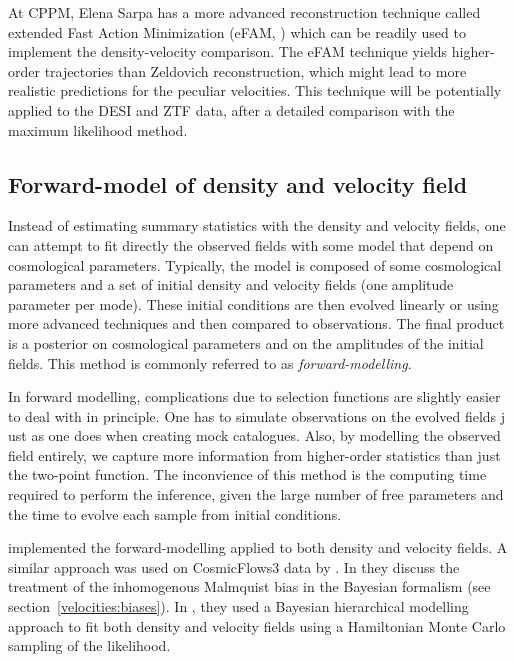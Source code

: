     At CPPM, Elena Sarpa has a more advanced reconstruction technique 
    called extended Fast Action Minimization (eFAM, \cite{sarpaExtendedFastAction2021})
    which can be readily used to implement the density-velocity comparison.
    The eFAM technique yields higher-order trajectories than 
    Zeldovich reconstruction, which might lead to more realistic 
    predictions for the peculiar velocities. 
    This technique will be potentially applied to the DESI and ZTF data,
    after a detailed comparison with the maximum likelihood method. 


    \subsection{Forward-model of density and velocity field}
    \label{velocities:methods:forward}

    Instead of estimating summary statistics with the density and velocity fields, 
    one can attempt to fit directly the observed fields with some model 
    that depend on cosmological parameters. Typically, the model is composed 
    of some cosmological parameters and a set of initial density and velocity fields
    (one amplitude parameter per mode). These initial conditions are then evolved 
    linearly or using more advanced techniques and then compared to observations. 
    The final product is a posterior on cosmological parameters and on the amplitudes 
    of the initial fields. This method is commonly referred to as \emph{forward-modelling}. 

    In forward modelling, complications due to selection functions are slightly easier 
    to deal with in principle. One has to simulate observations on the evolved fields j
    ust as one does when creating mock catalogues. 
    Also, by modelling the observed field entirely, we capture 
    more information from higher-order statistics than just the two-point function. 
    The inconvience of this method is the computing time required to perform the inference,
    given the large number of free parameters and the time to evolve each sample from initial conditions. 
    
    \cite{lavauxBayesian3DVelocity2016} implemented the forward-modelling applied to 
    both density and velocity fields. A similar approach was used on CosmicFlows3 data 
    by \cite{grazianiPeculiarVelocityField2019}. In \cite{boruahReconstructingDarkMatter2021}
    they discuss the treatment of the inhomogenous Malmquist bias in the Bayesian formalism 
    (see section~\ref{velocities:biases}).
    In \cite{prideaux-gheeFieldBasedPhysicalInference2022}, they used a Bayesian hierarchical modelling 
    approach to fit both density and velocity fields using a Hamiltonian Monte Carlo sampling of the 
    likelihood. 

